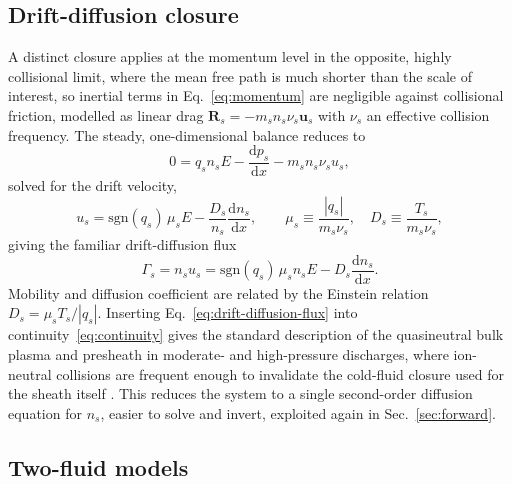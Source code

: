 \subsection{Drift-diffusion closure}

A distinct closure applies at the momentum level in the opposite, highly collisional limit, where the mean free path is much shorter than the scale of interest, so inertial terms in Eq.~\eqref{eq:momentum} are negligible against collisional friction, modelled as linear drag $\mathbf{R}_s = -m_sn_s\nu_s\mathbf{u}_s$ with $\nu_s$ an effective collision frequency. The steady, one-dimensional balance reduces to
\begin{equation}
0 = q_sn_sE - \frac{\mathrm{d}p_s}{\mathrm{d}x} - m_sn_s\nu_s u_s,
\end{equation}
solved for the drift velocity,
\begin{equation}
u_s = \mathrm{sgn}(q_s)\,\mu_s E - \frac{D_s}{n_s}\frac{\mathrm{d}n_s}{\mathrm{d}x}, \qquad \mu_s \equiv \frac{|q_s|}{m_s\nu_s}, \quad D_s \equiv \frac{T_s}{m_s\nu_s},
\label{eq:drift-diffusion-velocity}
\end{equation}
giving the familiar drift-diffusion flux
\begin{equation}
\Gamma_s = n_su_s = \mathrm{sgn}(q_s)\,\mu_sn_sE - D_s\frac{\mathrm{d}n_s}{\mathrm{d}x}.
\label{eq:drift-diffusion-flux}
\end{equation}
Mobility and diffusion coefficient are related by the Einstein relation $D_s = \mu_sT_s/|q_s|$. Inserting Eq.~\eqref{eq:drift-diffusion-flux} into continuity~\eqref{eq:continuity} gives the standard description of the quasineutral bulk plasma and presheath in moderate- and high-pressure discharges, where ion-neutral collisions are frequent enough to invalidate the cold-fluid closure used for the sheath itself \cite{ref0024,ref0077}. This reduces the system to a single second-order diffusion equation for $n_s$, easier to solve and invert, exploited again in Sec.~\ref{sec:forward}.

\subsection{Two-fluid models}

